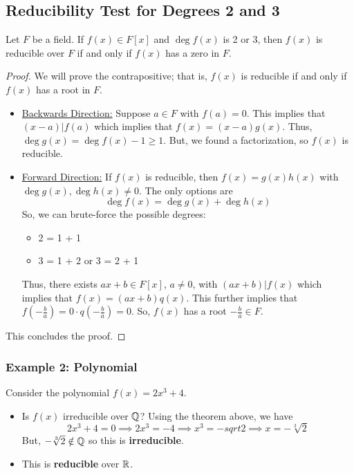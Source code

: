 \documentclass[letterpaper]{article}
\begin{document}
\subsection{Reducibility Test for Degrees 2 and 3}
\begin{theorem}{}{}
    Let $F$ be a field. If $f(x) \in F[x]$ and $\deg f(x)$ is 2 or 3, then $f(x)$ is reducible over $F$ if and only if $f(x)$ has a zero in $F$. 
\end{theorem}

\begin{mdframed}[]
    \begin{proof}
        We will prove the contrapositive; that is, $f(x)$ is reducible if and only if $f(x)$ has a root in $F$. 
        \begin{itemize}
            \item \underline{Backwards Direction:} Suppose $a \in F$ with $f(a) = 0$. This implies that $(x - a) | f(a)$ which implies that $f(x) = (x - a)g(x)$. Thus, $\deg g(x) = \deg f(x) - 1 \geq 1$. But, we found a factorization, so $f(x)$ is reducible. 
            \item \underline{Forward Direction:} If $f(x)$ is reducible, then $f(x) = g(x) h(x)$ with $\deg g(x), \deg h(x) \neq 0$. The only options are 
            \[\deg f(x) = \deg g(x) + \deg h(x)\]
            So, we can brute-force the possible degrees: 
            \begin{itemize}
                \item 2 = 1 + 1
                \item 3 = 1 + 2 or 3 = 2 + 1
            \end{itemize}
            Thus, there exists $ax + b \in F[x]$, $a \neq 0$, with $(ax + b) | f(x)$ which implies that $f(x) = (ax + b)q(x)$. This further implies that $f\left(-\frac{b}{a}\right) = 0 \cdot q\left(-\frac{b}{a}\right) = 0$. So, $f(x)$ has a root $-\frac{b}{a} \in F$. 
        \end{itemize}
        This concludes the proof. 
    \end{proof}
\end{mdframed}

\subsubsection{Example 2: Polynomial}
Consider the polynomial $f(x) = 2x^3 + 4$. 
\begin{itemize}
    \item Is $f(x)$ irreducible over $\mathbb{Q}$? Using the theorem above, we have 
    \[2x^3 + 4 = 0 \implies 2x^3 = -4 \implies x^3 = -sqrt{2} \implies x = - \sqrt[3]{2}\]
    But, $-\sqrt[3]{2} \notin \mathbb{Q}$ so this is \textbf{irreducible}.

    \item This is \textbf{reducible} over $\mathbb{R}$. 
\end{itemize}
\end{document}
